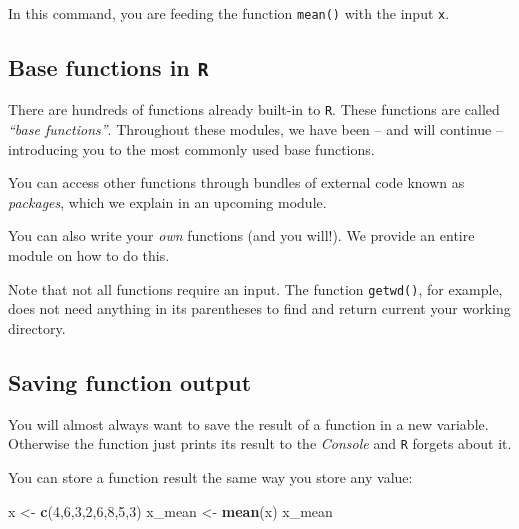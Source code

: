 \documentclass[
]{book}
\newenvironment{Shaded}{\begin{snugshade}}{\end{snugshade}}
\newcommand{\DecValTok}[1]{\textcolor[rgb]{0.00,0.00,0.81}{#1}}
\newcommand{\KeywordTok}[1]{\textcolor[rgb]{0.13,0.29,0.53}{\textbf{#1}}}
\newcommand{\NormalTok}[1]{#1}
\newcommand{\StringTok}[1]{\textcolor[rgb]{0.31,0.60,0.02}{#1}}
\begin{document}
In this command, you are feeding the function \texttt{mean()} with the input \texttt{x}.

\hypertarget{base-functions-in-r}{%
\subsection*{\texorpdfstring{Base functions in \texttt{R}}{Base functions in R}}\label{base-functions-in-r}}

There are hundreds of functions already built-in to \texttt{R}. These functions are called \emph{``base functions''}. Throughout these modules, we have been -- and will continue -- introducing you to the most commonly used base functions.

You can access other functions through bundles of external code known as \emph{packages}, which we explain in an upcoming module.

You can also write your \emph{own} functions (and you will!). We provide an entire module on how to do this.

Note that not all functions require an input. The function \texttt{getwd()}, for example, does not need anything in its parentheses to find and return current your working directory.

\hypertarget{saving-function-output}{%
\subsection*{Saving function output}\label{saving-function-output}}

You will almost always want to save the result of a function in a new variable. Otherwise the function just prints its result to the \emph{Console} and \texttt{R} forgets about it.

You can store a function result the same way you store any value:

\begin{Shaded}
\begin{Highlighting}[]
\NormalTok{x <-}\StringTok{ }\KeywordTok{c}\NormalTok{(}\DecValTok{4}\NormalTok{,}\DecValTok{6}\NormalTok{,}\DecValTok{3}\NormalTok{,}\DecValTok{2}\NormalTok{,}\DecValTok{6}\NormalTok{,}\DecValTok{8}\NormalTok{,}\DecValTok{5}\NormalTok{,}\DecValTok{3}\NormalTok{) }
\NormalTok{x_mean <-}\StringTok{ }\KeywordTok{mean}\NormalTok{(x) }
\NormalTok{x_mean}
\end{Highlighting}
\end{Shaded}
\end{document}
